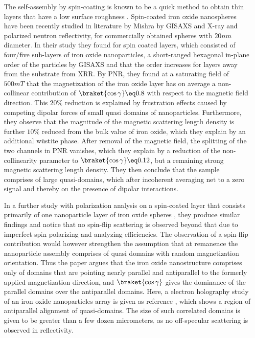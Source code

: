 \documentclass[\main/dresen_thesis.tex]{subfiles}
\begin{document}
  The self-assembly by spin-coating is known to be a quick method to obtain thin layers that have a low surface roughness \cite{Xu_2012_Trans}.
  Spin-coated iron oxide nanospheres have been recently studied in literature by Mishra \etal \cite{Mishra_2012_Selfa} by GISAXS and X-ray and polarized neutron reflectivity, for commercially obtained spheres with $20 \unit{nm}$ diameter.
  In their study they found for spin coated layers, which consisted of four/five sub-layers of iron oxide nanoparticles, a short-ranged hexagonal in-plane order of the particles by GISAXS and that the order increases for layers away from the substrate from XRR.
  By PNR, they found at a saturating field of $500 \unit{mT}$ that the magnetization of the iron oxide layer has on average a non-collinear contribution of $\braket{\cos{\gamma}} \eq 0.8$ with respect to the magnetic field direction.
  This $20 \%$ reduction is explained by frustration effects caused by competing dipolar forces of small quasi domains of nanoparticles.
  Furthermore, they observe that the magnitude of the magnetic scattering length density is further $10 \%$ reduced from the bulk value of iron oxide, which they explain by an additional w\"ustite phase.
  After removal of the magnetic field, the splitting of the two channels in PNR vanishes, which they explain by a reduction of the non-collinearity parameter to $\braket{\cos{\gamma}} \eq 0.12$, but a remaining strong magnetic scattering length density.
  They then conclude that the sample comprises of large quasi-domains, which after incoherent averaging net to a zero signal and thereby on the presence of dipolar interactions.

  In a further study with polarization analysis on a spin-coated layer that consists primarily of one nanoparticle layer of iron oxide spheres \cite{Mishra_2015_Polar}, they produce similar findings and notice that no spin-flip scattering is observed beyond that due to imperfect spin polarizing and analyzing efficiencies.
  The observation of a spin-flip contribution would however strengthen the assumption that at remanence the nanoparticle assembly comprises of quasi domains with random magnetization orientation.
  Thus the paper argues that the iron oxide nanostructure comprises only of domains that are pointing nearly parallel and antiparallel to the formerly applied magnetization direction, and $\braket{\cos{\gamma}}$ gives the dominance of the parallel domains over the antiparallel domains.
  Here, a electron holography study of an iron oxide nanoparticles array is given as reference \cite{Yamamoto_2011_Dipol}, which shows a region of antiparallel alignment of quasi-domains.
  The size of such correlated domains is given to be greater than a few dozen micrometers, as no off-specular scattering is observed in reflectivity.
\end{document}
